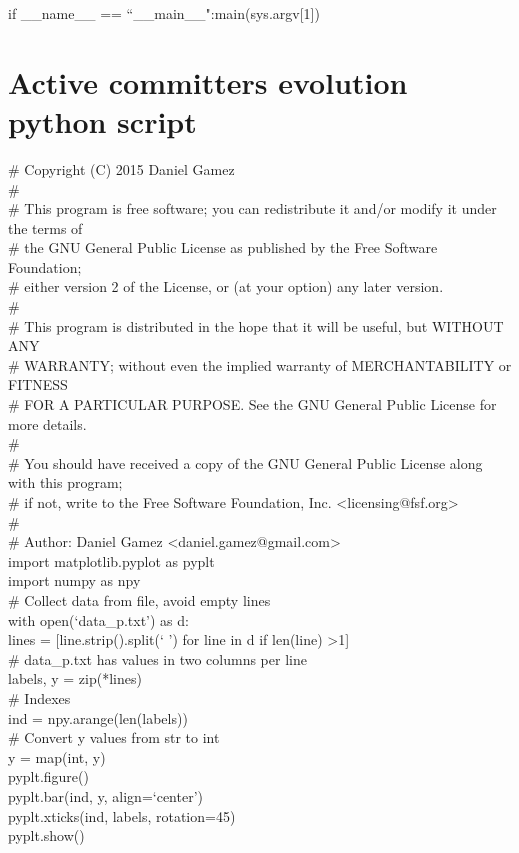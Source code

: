 \documentclass[a4paper, 12pt]{book}
\begin{document}
\noindent if \_\_name\_\_ == ``\_\_main\_\_":main(sys.argv[1])\\



\chapter{Active committers evolution python script}
\label{app:appendix3}

\# Copyright (C) 2015 Daniel Gamez \\
\#\\
\# This program is free software; you can redistribute it and/or modify it under the terms of \\
\# the GNU General Public License as published by the Free Software Foundation; \\
\# either version 2 of the License, or (at your option) any later version.\\
\#\\
\# This program is distributed in the hope that it will be useful, but WITHOUT ANY \\
\# WARRANTY; without even the implied warranty of MERCHANTABILITY or FITNESS \\
\# FOR A PARTICULAR PURPOSE. See the GNU General Public License for more details.\\
\#\\
\# You should have received a copy of the GNU General Public License along with this program; \\
\# if not, write to the Free Software Foundation, Inc. \textless licensing@fsf.org\textgreater \\
\#\\
\# Author: Daniel Gamez \textless daniel.gamez@gmail.com\textgreater \\

\noindent import matplotlib.pyplot as pyplt\\
\noindent import numpy as npy\\

\noindent \# Collect data from file, avoid empty lines\\

\noindent with open(`data\_p.txt') as d:\\
  lines = [line.strip().split(` ') for line in d if len(line) \textgreater 1]\\
\noindent  \# data\_p.txt has values in two columns per line\\
  
\noindent labels, y = zip(*lines)\\

\noindent \# Indexes\\
\noindent ind = npy.arange(len(labels))\\

\noindent \# Convert y values from str to int\\
\noindent y = map(int, y)\\

\noindent pyplt.figure()\\
\noindent pyplt.bar(ind, y, align=`center')\\
\noindent pyplt.xticks(ind, labels, rotation=45)\\
\noindent pyplt.show()
\end{document}
